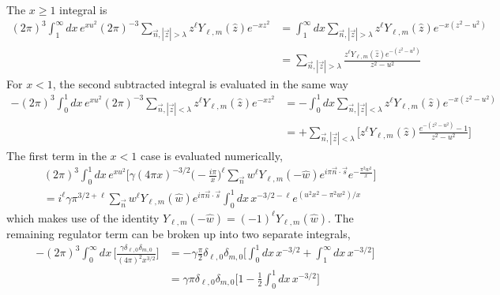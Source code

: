 \documentclass[a4paper]{article}
\begin{document}
The $x\geq1$ integral is
\begin{align}
 (2\pi)^{3} \int_{1}^{\infty} dx \, e^{x u^{2}}
 (2\pi)^{-3} \sum_{\vec{n},|\vec{z}|>\lambda} z^{\ell} Y_{\ell,m}(\hat{z}) e^{ - x z^{2} }
 &= \int_{1}^{\infty} dx
 \sum_{\vec{n},|\vec{z}|>\lambda} z^{\ell} Y_{\ell,m}(\hat{z}) e^{-x (z^{2} - u^{2})}
 \nonumber\\
 &= \sum_{\vec{n},|\vec{z}|>\lambda}
 \frac{ z^{\ell} Y_{\ell,m}(\hat{z}) e^{- (z^{2} - u^{2})} }{ z^{2}-u^{2} }
\end{align}
For $x<1$, the second subtracted integral is evaluated in the same way
\begin{align}
 -(2\pi)^{3} \int_{0}^{1} dx \, e^{x u^{2}}
 (2\pi)^{-3} \sum_{\vec{n},|\vec{z}|<\lambda} z^{\ell} Y_{\ell,m}(\hat{z}) e^{ - x z^{2} }
 &= - \int_{0}^{1} dx
 \sum_{\vec{n},|\vec{z}|<\lambda} z^{\ell} Y_{\ell,m}(\hat{z}) e^{-x (z^{2} - u^{2})}
 \nonumber\\
 &= +\sum_{\vec{n},|\vec{z}|<\lambda}
 \Biggr[ z^{\ell} Y_{\ell,m}(\hat{z}) \frac{ e^{ -(z^{2} - u^{2})} - 1 }{ z^{2}-u^{2} } \Biggr]
\end{align}
The first term in the $x<1$ case is evaluated numerically,
\begin{align}
 &(2\pi)^{3} \int_{0}^{1} dx \, e^{ x u^{2} } \Biggr[ \gamma (4\pi x)^{-3/2}
 \big(-\frac{i\pi}{x}\big)^{\ell}
 \sum_{\vec{n}} w^{\ell} Y_{\ell,m}(-\hat{w})
 e^{i\pi \vec{n}\cdot\vec{s}} e^{ -\frac{\pi^{2}w^{2}}{x} } \Biggr]
 \nonumber\\
 &=
 i^\ell \gamma \pi^{3/2+\ell}
 \sum_{\vec{n}} w^{\ell} Y_{\ell,m}(\hat{w}) e^{i\pi \vec{n}\cdot\vec{s}}
 \int_{0}^{1} dx \, x^{-3/2-\ell} e^{ (u^{2} x^{2} -\pi^{2}w^{2}) /x }
\end{align}
 which makes use of the identity $Y_{\ell,m}(-\hat{w}) = (-1)^{\ell} Y_{\ell,m}(\hat{w})$.
The remaining regulator term can be broken up into two separate integrals,
\begin{align}
 -(2\pi)^{3} \int_{0}^{\infty} dx \,
 \Biggr[ \frac{ \gamma \delta_{\ell,0} \delta_{m,0} }{(4\pi)^{2} x^{3/2} } \Biggr]
 &= -\gamma \frac{\pi}{2} \delta_{\ell,0} \delta_{m,0}
 \Big[ \int_{0}^{1} dx \, x^{-3/2} + \int_{1}^{\infty} dx \, x^{-3/2} \Big]
 \nonumber\\
 &= \gamma \pi \delta_{\ell,0} \delta_{m,0}
 \Big[ 1 -\frac{1}{2} \int_{0}^{1} dx \, x^{-3/2} \Big]
\end{align}
\end{document}

